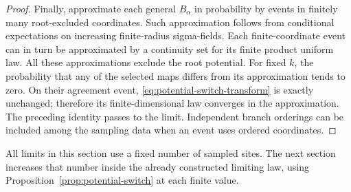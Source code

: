 \begin{proof}
Finally, approximate each general $B_\alpha$ in probability by
events in finitely many root-excluded coordinates. Such
approximation follows from conditional expectations on increasing
finite-radius sigma-fields. Each finite-coordinate event can in
turn be approximated by a continuity set for its finite product
uniform law. All these approximations exclude the root potential.
For fixed $k$, the probability that any of the selected maps
differs from its approximation tends to zero. On their agreement
event, \eqref{eq:potential-switch-transform} is exactly unchanged;
therefore its finite-dimensional law converges in the approximation.
The preceding identity passes to the limit. Independent branch
orderings can be included among the sampling data when an event
uses ordered coordinates.
\end{proof}

All limits in this section use a fixed number of sampled sites.
The next section increases that number inside the already
constructed limiting law, using
Proposition~\ref{prop:potential-switch} at each finite value.

